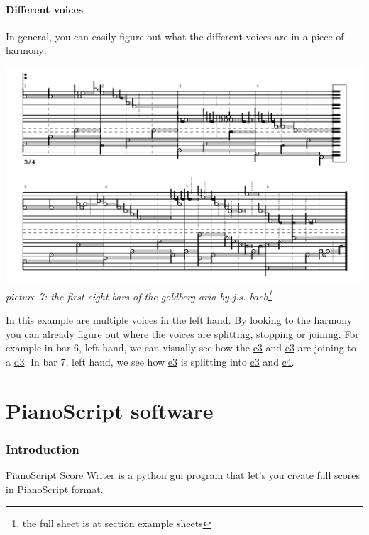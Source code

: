 \documentclass[11pt,a4paper]{article}
\begin{document}
\subsection{Different voices}
In general, you can easily figure out what the different voices are in a piece of harmony:
\begin{center}
\includegraphics[width=1\textwidth]{images/goldberg.jpg}\\
\emph{\small picture 7: the first eight bars of the goldberg aria by j.s. bach\footnote{the full sheet is at section example sheets}} 
\end{center}
In this example are multiple voices in the left hand. By looking to the harmony you can already figure out where the voices are splitting, stopping or joining. For example in bar 6, left hand, we can visually see how the \underline{c3} and \underline{e3} are joining to a \underline{d3}. In bar 7, left hand, we see how \underline{e3} is splitting into \underline{c3} and \underline{c4}.



\pagebreak
\part{PianoScript software}
\section{Introduction}
PianoScript Score Writer is a python gui program that let's you create full scores in PianoScript format.
\end{document}

